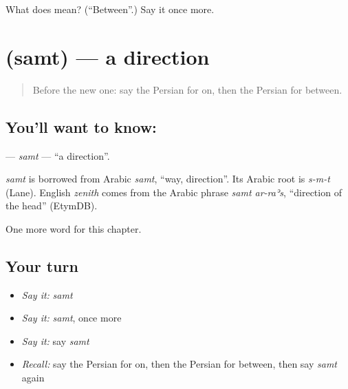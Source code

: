 \begin{tcolorbox}[breakable,colback=teal!4,colframe=teal!35!black,title={Before you move on}]
What does  mean? (\textquotedblleft{}Between\textquotedblright{}.) Say it once more.
\end{tcolorbox}
\section[\texorpdfstring{\fa{سمت} (samt)}{سمت (samt)}]{ (samt) — a direction}

\label{lesson:FA-C86-samt}



\begin{quote}
Before the new one: say the Persian for on, then the Persian for between.
\end{quote}

\subsection*{You'll want to know: }
\textbf{} — \emph{samt} — \textquotedblleft{}a direction\textquotedblright{}.

\begin{cousinweb}
\emph{samt} is borrowed from Arabic \emph{samt}, \textquotedblleft{}way, direction\textquotedblright{}. Its Arabic root is \emph{s-m-t} (Lane). English \emph{zenith} comes from the Arabic phrase \emph{samt ar-raʾs}, \textquotedblleft{}direction of the head\textquotedblright{} (EtymDB).
\end{cousinweb}

\begin{grammarlens}[title={What you've built}]
One more word for this chapter.
\end{grammarlens}

\subsection*{Your turn}
\begin{itemize}
\raggedright
  \item \emph{Say it:} \emph{samt}
  \item \emph{Say it:} \emph{samt}, once more
  \item \emph{Say it:} say \emph{samt}
  \item \emph{Recall:} say the Persian for on, then the Persian for between, then say \emph{samt} again
\end{itemize}

